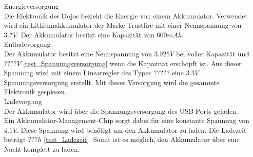 Energieversorgung\\
Die Elektronik des Dojos bezieht die Energie von einem Akkumulator. Verwendet wird ein Lithiumakkumulator der Marke Trustfire mit einer Nennspannung von $3.7V$. Der Akkumulator besitzt eine Kapazität von $600mAh$.\\

Entladevorgang\\ 
Der Akkumulator besitzt eine Nennspannung von $3.925V$ bei voller Kapazität und $????V$ \ref{test_Spannungsversorgung} wenn die Kapazität erschöpft ist. Aus dieser Spannung wird mit einem Linearregler des Types ????? eine $3.3V$ Spannungsversorgung erstellt. Mit dieser Versorgung wird die gesammte Elektronik gespiesen.\\

Ladevorgang\\
Der Akkumulator wird über die Spannungsversorgung des USB-Ports geladen. Ein Akkumulator-Management-Chip sorgt dabei für eine konstante Spannung von $4.1V$. Diese Spannung wird benötigt um den Akkumulator zu laden. Die Ladezeit beträgt $???h$ \ref{test_Ladezeit}. Somit ist es möglich, den Akkumulator über eine Nacht komplett zu laden. 